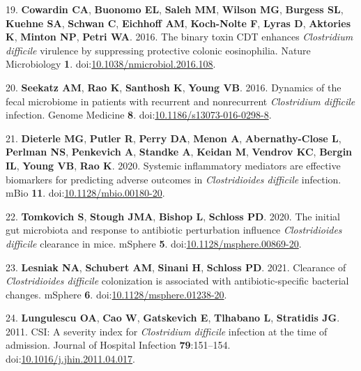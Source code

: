 \documentclass[
  12pt,
]{article}
\newenvironment{cslreferences}%
  {}%
  {\par}
\begin{document}
\begin{cslreferences}
\leavevmode\hypertarget{ref-Cowardin2016}{}%
19. \textbf{Cowardin CA}, \textbf{Buonomo EL}, \textbf{Saleh MM},
\textbf{Wilson MG}, \textbf{Burgess SL}, \textbf{Kuehne SA},
\textbf{Schwan C}, \textbf{Eichhoff AM}, \textbf{Koch-Nolte F},
\textbf{Lyras D}, \textbf{Aktories K}, \textbf{Minton NP}, \textbf{Petri
WA}. 2016. The binary toxin CDT enhances \emph{Clostridium difficile}
virulence by suppressing protective colonic eosinophilia. Nature
Microbiology \textbf{1}.
doi:\href{https://doi.org/10.1038/nmicrobiol.2016.108}{10.1038/nmicrobiol.2016.108}.

\leavevmode\hypertarget{ref-Seekatz2016}{}%
20. \textbf{Seekatz AM}, \textbf{Rao K}, \textbf{Santhosh K},
\textbf{Young VB}. 2016. Dynamics of the fecal microbiome in patients
with recurrent and nonrecurrent \emph{Clostridium difficile} infection.
Genome Medicine \textbf{8}.
doi:\href{https://doi.org/10.1186/s13073-016-0298-8}{10.1186/s13073-016-0298-8}.

\leavevmode\hypertarget{ref-Dieterle2020}{}%
21. \textbf{Dieterle MG}, \textbf{Putler R}, \textbf{Perry DA},
\textbf{Menon A}, \textbf{Abernathy-Close L}, \textbf{Perlman NS},
\textbf{Penkevich A}, \textbf{Standke A}, \textbf{Keidan M},
\textbf{Vendrov KC}, \textbf{Bergin IL}, \textbf{Young VB}, \textbf{Rao
K}. 2020. Systemic inflammatory mediators are effective biomarkers for
predicting adverse outcomes in \emph{Clostridioides difficile}
infection. mBio \textbf{11}.
doi:\href{https://doi.org/10.1128/mbio.00180-20}{10.1128/mbio.00180-20}.

\leavevmode\hypertarget{ref-Tomkovich2020}{}%
22. \textbf{Tomkovich S}, \textbf{Stough JMA}, \textbf{Bishop L},
\textbf{Schloss PD}. 2020. The initial gut microbiota and response to
antibiotic perturbation influence \emph{Clostridioides difficile}
clearance in mice. mSphere \textbf{5}.
doi:\href{https://doi.org/10.1128/msphere.00869-20}{10.1128/msphere.00869-20}.

\leavevmode\hypertarget{ref-Lesniak2021}{}%
23. \textbf{Lesniak NA}, \textbf{Schubert AM}, \textbf{Sinani H},
\textbf{Schloss PD}. 2021. Clearance of \emph{Clostridioides difficile}
colonization is associated with antibiotic-specific bacterial changes.
mSphere \textbf{6}.
doi:\href{https://doi.org/10.1128/msphere.01238-20}{10.1128/msphere.01238-20}.

\leavevmode\hypertarget{ref-Lungulescu2011}{}%
24. \textbf{Lungulescu OA}, \textbf{Cao W}, \textbf{Gatskevich E},
\textbf{Tlhabano L}, \textbf{Stratidis JG}. 2011. CSI: A severity index
for \emph{Clostridium difficile} infection at the time of admission.
Journal of Hospital Infection \textbf{79}:151--154.
doi:\href{https://doi.org/10.1016/j.jhin.2011.04.017}{10.1016/j.jhin.2011.04.017}.


\end{cslreferences}
\end{document}
